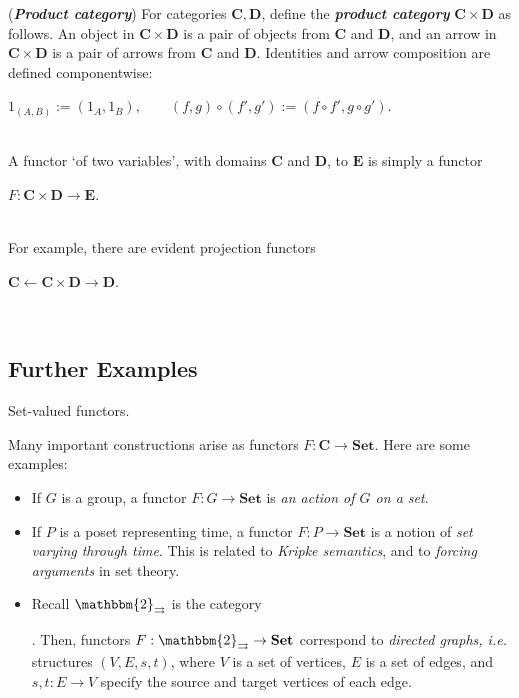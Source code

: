 \documentclass[]{amsbook}
\newcommand{\qq}{\qquad}
\newcommand{\catname}[1]{\mathbf{#1}}
\newcommand{\0}{\mathbf{0}}
\newcommand{\1}{\mathbf{1}}
\begin{document}
(\emph{\textbf{Product category}}) For categories $\catname{C}, \catname{D}$,
define the \emph{\textbf{product category}} $\catname{C} \times \catname{D}$ as
follows. An object in $\catname{C} \times \catname{D}$ is a pair of objects
from $\catname{C}$ and $\catname{D}$, and an arrow in $\catname{C} \times
\catname{D}$ is a pair of arrows from $\catname{C}$ and $\catname{D}$.
Identities and arrow composition are defined componentwise:
\begin{center}
    $1_{(A, B)} := (1_A, 1_B), \qq (f, g) \circ (f', g') := (f \circ f',
    g \circ g')$.
\end{center}
~\\
A functor `of two variables', with domains $\catname{C}$ and $\catname{D}$, to
$\catname{E}$ is simply a functor
\begin{center}
    $F: \catname{C} \times \catname{D} \to \catname{E}$.
\end{center}
~\\
For example, there are evident projection functors
\begin{center}
    $\catname{C} \leftarrow \catname{C} \times \catname{D} \to \catname{D}$.
\end{center}
~\\

\subsection*{Further Examples}
Set-valued functors.

Many important constructions arise as functors $F: \catname{C} \to
\catname{Set}$. Here are some examples:
\begin{itemize}
    \item If $G$ is a group, a functor $F: G \to \catname{Set}$ is \emph{an
    action of $G$ on a set}.

    \item If $P$ is a poset representing time, a functor $F: P \to
    \catname{Set}$ is a notion of \emph{set varying through time}. This is
    related to \emph{Kripke semantics}, and to \emph{forcing arguments} in set
    theory.

    \item Recall $\mathbbm{2}_{\rightrightarrows}$ is the category
    .
    Then, functors $F: \mathbbm{2}_{\rightrightarrows} \to \catname{Set}$
    correspond to \emph{directed graphs, i.e.} structures $(V, E, s, t)$, where
    $V$ is a set of vertices, $E$ is a set of edges, and $s, t: E \to V$
    specify the source and target vertices of each edge.
\end{itemize}
\end{document}
